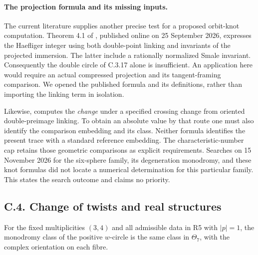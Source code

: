 \paragraph{The projection formula and its missing inputs.}
The current literature supplies another precise test for a proposed
orbit-knot computation. Theorem 4.1 of
\citet{GauniyalTurchin2026Root}, published online on
25 September 2026, expresses the Haefliger integer using both
double-point linking and invariants of the projected immersion.
The latter include a rationally normalized Smale invariant.
Consequently the double circle of C.3.17 alone is insufficient.
An application here would require an actual compressed projection
and its tangent-framing comparison. We opened the published
formula and its definitions, rather than importing the linking
term in isolation.

Likewise, \citet[Theorem 2.5]{Sakai2015Root} computes the
\emph{change} under a specified crossing change from oriented
double-preimage linking. To obtain an absolute value by that
route one must also identify the comparison embedding and its
class. Neither formula identifies the present trace with a
standard reference embedding. The characteristic-number cap
retains those geometric comparisons as explicit requirements.
Searches on 15 November 2026 for the six-sphere family,
its degeneration monodromy, and these knot formulas did not
locate a numerical determination for this particular family.
This states the search outcome and claims no priority.

\subsection{C.4. Change of twists and real structures}

\begin{proposition}
For the fixed multiplicities $(3,4)$ and all admissible data in R5
with $|p|=1$, the monodromy class of the positive $w$-circle is the
same class in $\Theta_7$, with the complex orientation on each fibre.
\end{proposition}

